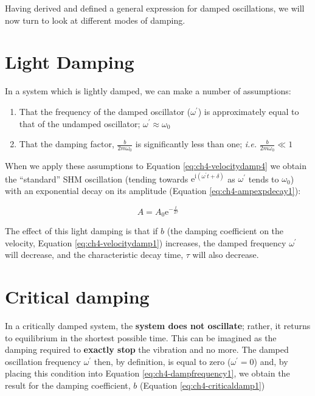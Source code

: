 \documentclass[
]{book}
\providecommand{\tightlist}{%
  \setlength{\itemsep}{0pt}\setlength{\parskip}{0pt}}
\begin{document}
Having derived and defined a general expression for damped oscillations, we will now turn to look at different modes of damping.

\hypertarget{sec:ch4-lightdamping}{%
\section{Light Damping}\label{sec:ch4-lightdamping}}

In a system which is lightly damped, we can make a number of assumptions:

\begin{enumerate}
\def\labelenumi{\arabic{enumi}.}
\tightlist
\item
  That the frequency of the damped oscillator (\(\omega ^\prime\)) is approximately equal to that of the undamped oscillator; \(\omega ^\prime \approx \omega_0\)
\item
  That the damping factor, \(\frac{b}{2m\omega_0}\) is significantly less than one; \emph{i.e.} \(\frac{b}{2m\omega_0} \ll 1\)
\end{enumerate}

When we apply these assumptions to Equation \eqref{eq:ch4-velocitydamp4} we obtain the ``standard'' SHM oscillation (tending towards \(\mathrm{e}^{\mathrm{i}(\omega^\prime t + \delta)}\) as \(\omega ^\prime\) tends to \(\omega_0\)) with an exponential decay on its amplitude (Equation \eqref{eq:ch4-ampexpdecay1}):

\begin{equation}
A = A_0 \mathrm{e}^{-\frac{t}{2\tau}}
\label{eq:ch4-ampexpdecay1}
\end{equation}

The effect of this light damping is that if \(b\) (the damping coefficient on the velocity, Equation \eqref{eq:ch4-velocitydamp1}) increases, the damped frequency \(\omega^\prime\) will decrease, and the characteristic decay time, \(\tau\) will also decrease.

\hypertarget{sec:ch4-criticaldamping}{%
\section{Critical damping}\label{sec:ch4-criticaldamping}}

In a critically damped system, the \textbf{system does not oscillate}; rather, it returns to equilibrium in the shortest possible time. This can be imagined as the damping required to \textbf{exactly stop} the vibration and no more. The damped oscillation frequency \(\omega^\prime\) then, by definition, is equal to zero (\(\omega^\prime = 0\)) and, by placing this condition into Equation \eqref{eq:ch4-dampfrequency1}, we obtain the result for the damping coefficient, \(b\) (Equation \eqref{eq:ch4-criticaldamp1})
\end{document}
